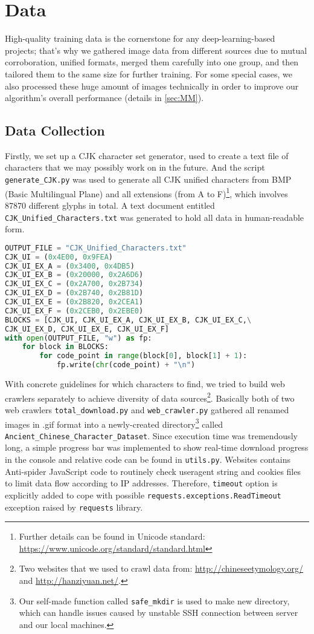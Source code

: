 \chapter{Data}
High-quality training data is the cornerstone for any deep-learning-based projects; that's why we gathered image data from different sources due to mutual corroboration, unified formats, merged them carefully into one group, and then tailored them to the same size for further training. For some special cases, we also processed these huge amount of images technically in order to improve our algorithm's overall performance (details in \ref{sec:MM}).

\section{Data Collection}
Firstly, we set up a CJK character set generator, used to create a text file of characters that we may possibly work on in the future. And the script \texttt{generate\_CJK.py} was used to generate all CJK unified characters from BMP (Basic Multilingual Plane) and all extensions (from A to F)\footnote{Further details can be found in Unicode standard: \url{https://www.unicode.org/standard/standard.html}}, which involves 87870 different glyphs in total. A text document entitled \texttt{CJK\_Unified\_Characters.txt} was generated to hold all data in human-readable form.
\begin{lstlisting}[language = Python, caption = Character Generation]
OUTPUT_FILE = "CJK_Unified_Characters.txt"
CJK_UI = (0x4E00, 0x9FEA)
CJK_UI_EX_A = (0x3400, 0x4DB5)
CJK_UI_EX_B = (0x20000, 0x2A6D6)
CJK_UI_EX_C = (0x2A700, 0x2B734)
CJK_UI_EX_D = (0x2B740, 0x2B81D)
CJK_UI_EX_E = (0x2B820, 0x2CEA1)
CJK_UI_EX_F = (0x2CEB0, 0x2EBE0)
BLOCKS = [CJK_UI, CJK_UI_EX_A, CJK_UI_EX_B, CJK_UI_EX_C,\
CJK_UI_EX_D, CJK_UI_EX_E, CJK_UI_EX_F]
with open(OUTPUT_FILE, "w") as fp:
	for block in BLOCKS:
		for code_point in range(block[0], block[1] + 1):
			fp.write(chr(code_point) + "\n")
\end{lstlisting}

With concrete guidelines for which characters to find, we tried to build web crawlers separately to achieve diversity of data sources\footnote{Two websites that we used to crawl data from: \url{http://chineseetymology.org/} and \url{http://hanziyuan.net/}.}. Basically both of two web crawlers \texttt{total\_download.py} and \texttt{web\_crawler.py} gathered all renamed images in .gif format into a newly-created directory\footnote{Our self-made function called \texttt{safe\_mkdir} is used to make new directory, which can handle issues caused by unstable SSH connection between server and our local machines.} called \texttt{Ancient\_Chinese\_Character\_Dataset}. Since execution time was tremendously long, a simple progress bar was implemented to show real-time download progress in the console and relative code can be found in \texttt{utils.py}. Websites contains Anti-spider JavaScript code to routinely check useragent string and cookies files to limit data flow according to IP addresses. Therefore, \texttt{timeout} option is explicitly added to cope with possible \texttt{requests.exceptions.ReadTimeout} exception raised by \texttt{requests} library.

